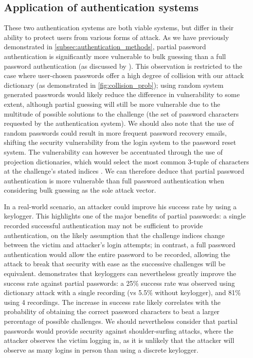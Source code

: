 \documentclass[british,11pt,a4paper]{article}
\begin{document}
\subsection{Application of authentication systems}
These two authentication systems are both viable systems, but differ in their ability to protect users from various forms of attack. As we have previously demonstrated in \autoref{subsec:authentication_methods}, partial password authentication is significantly more vulnerable to bulk guessing than a full password authentication (as discussed by \citet{Aspinall2013-sh}). This observation is restricted to the case where user-chosen passwords offer a high degree of collision with our attack dictionary (as demonstrated in \autoref{fig:collision_prob}); using random system generated passwords would likely reduce the difference in vulnerability to some extent, although partial guessing will still be more vulnerable due to the multitude of possible solutions to the challenge (the set of password characters requested by the authentication system). We should also note that the use of random passwords could result in more frequent password recovery emails, shifting the security vulnerability from the login system to the password reset system. The vulnerability can however be accentuated through the use of projection dictionaries, which would select the most common 3-tuple of characters at the challenge's stated indices \cite{Aspinall2013-sh}. We can therefore deduce that partial password authentication is more vulnerable than full password authentication when considering bulk guessing as the sole attack vector.

In a real-world scenario, an attacker could improve his success rate by using a keylogger. This highlights one of the major benefits of partial passwords: a single recorded successful authentication may not be sufficient to provide authentication, on the likely assumption that the challenge indices change between the victim and attacker's login attempts; in contrast, a full password authentication would allow the entire password to be recorded, allowing the attack to break that security with ease as the successive challenges will be equivalent. \citet{Aspinall2013-sh} demonstrates that keyloggers can nevertheless greatly improve the success rate against partial passwords: a 25\% success rate was observed using dictionary attack with a single recording (vs 5.5\% without keylogger), and 81\% using 4 recordings. The increase in success rate likely correlates with the probability of obtaining the correct password characters to beat a larger percentage of possible challenges. We should nevertheless consider that partial passwords would provide security against shoulder-surfing attacks, where the attacker observes the victim logging in, as it is unlikely that the attacker will observe as many logins in person than using a discrete keylogger. 
\end{document}
